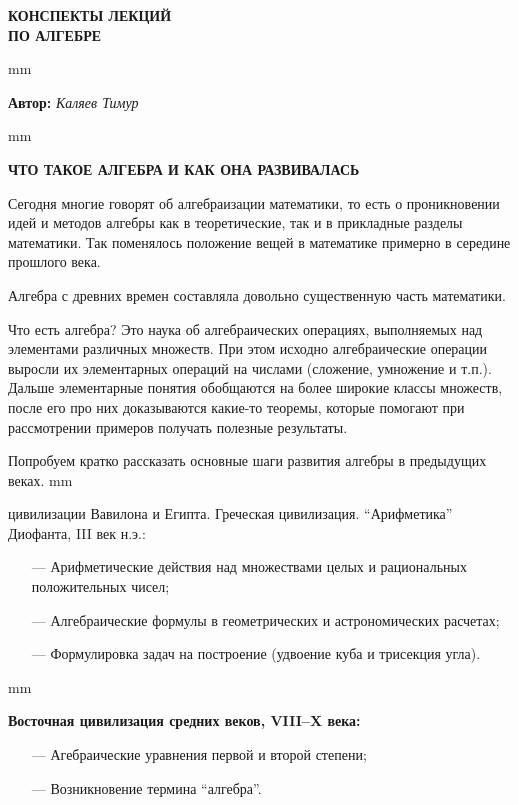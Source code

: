 \documentclass[12pt,english,russian]{article}
\begin{document}
		\begin{center}
			{\Huge {\bf КОНСПЕКТЫ ЛЕКЦИЙ\\ ПО АЛГЕБРЕ}  }
		\end{center}
	 mm
		\begin{center}
			{\large {\bf Автор:} \textit{Каляев Тимур}}
		\end{center}
		
	 mm
		\begin{center}
			{\large {\bf ЧТО ТАКОЕ АЛГЕБРА И КАК ОНА РАЗВИВАЛАСЬ}}
		\end{center}
	
	
	Сегодня многие говорят об алгебраизации математики, то есть
	о проникновении идей и методов алгебры как в теоретические,
	так и в прикладные разделы математики. Так поменялось положение 
	вещей в математике примерно в середине прошлого века.
	
	Алгебра с древних времен составляла довольно существенную
	часть математики.
	
	Что есть алгебра? Это наука об алгебраических операциях, выполняемых 
	над элементами различных множеств. При этом исходно 
	алгебраические операции выросли их элементарных операций 
	на числами (сложение, умножение и т.п.). Дальше элементарные 
	понятия обобщаются на более широкие классы множеств,
	после его про них доказываются какие-то теоремы, которые помогают 
	при рассмотрении примеров получать полезные результаты.
	
	Попробуем кратко рассказать основные шаги развития алгебры 
	в предыдущих веках.
	 mm
	
	{ цивилизации Вавилона и Египта. Греческая цивилизация. 
	“Арифметика” Диофанта, III век н.э.:}
	\begin{enumerate}
	\item[---] Арифметические действия над множествами целых и рациональных 
	положительных чисел;
	\item[---] Алгебраические формулы в геометрических и астрономических расчетах;
	\item[---] Формулировка задач на построение (удвоение куба и трисекция угла).
	\end{enumerate}
	
	 mm
	
	{\bf Восточная цивилизация средних веков, VIII–X века:}
	\begin{enumerate}
	\item[---] Агебраические уравнения первой и второй степени;
	\item[---] Возникновение термина “алгебра”.
	\end{enumerate}
	
\end{document}
